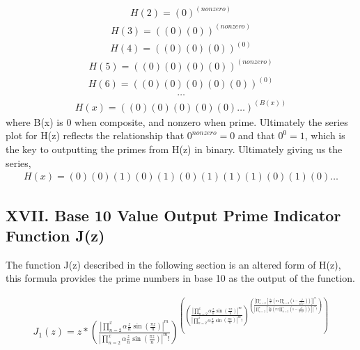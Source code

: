 \documentclass{article}
\begin{document}
\begin{align*}
H(2) = (0)^{(nonzero)}
\end{align*}
\begin{align*}
H(3) = ((0)(0))^{(nonzero)}
\end{align*}
\begin{align*}
H(4) = ((0)(0)(0))^{(0)}
\end{align*}
\begin{align*}
H(5) = ((0)(0)(0)(0))^{(nonzero)}
\end{align*}
\begin{align*}
H(6) = ((0)(0)(0)(0)(0))^{(0)}
\end{align*}
\begin{align*}
\ldots
\end{align*}
\begin{align*}
H(x) = ((0)(0)(0)(0)(0)\ldots)^{(B(x))}
\end{align*}
where B(x) is 0 when composite, and nonzero when prime. Ultimately the series plot for H(z) reflects the relationship that $0^{nonzero} = 0$ and that $0^{0} = 1$, which is the key to outputting the primes from H(z) in binary. Ultimately giving us the series,
\begin{align*}
H(x) = (0)(0)(1)(0)(1)(0)(1)(1)(1)(0)(1)(0)\ldots
\end{align*}

\newpage
\subsection*{XVII. Base 10 Value Output Prime Indicator Function J(z)}
The function J(z) described in the following section is an altered form of H(z), this formula provides the prime numbers in base 10 as the output of the function.

\begin{align*}
J_{1}(z) = z * \left(\frac{|\prod_{n=2}^x \alpha\frac{z}{n}\sin\left(\frac{\pi z}{n}\right)|^{m}}{|\prod_{n=2}^x \alpha\frac{z}{n}\sin\left(\frac{\pi z}{n}\right)|^{m}!}\right)^{\left(\left(\frac{|\prod_{n=2}^x \alpha\frac{z}{n}\sin\left(\frac{\pi z}{n}\right)|^{m}}{|\prod_{n=2}^x \alpha\frac{z}{n}\sin\left(\frac{\pi z}{n}\right)|^{m}!}\right)^{\left(\frac{|\prod_{n=2}^x\left[\frac{\beta z}{n}\left({\pi z}\prod_{k=2}^z\left(1 - \frac{z^2}{k^2n^2}\right)\right)\right]|^{m}}{|\prod_{n=2}^x\left[\frac{\beta z}{n}\left({\pi z}\prod_{k=2}^z\left(1 - \frac{z^2}{k^2n^2}\right)\right)\right]|^{m}!}\right)}\right)}
\end{align*}
\end{document}
